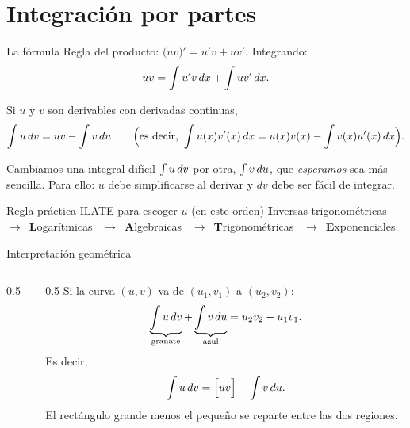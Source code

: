 \documentclass[10pt,aspectratio=169]{beamer}
\begin{document}
\section{Integración por partes}

\begin{frame}{La fórmula}
  Regla del producto: $\big(u v\big)'=u'v+uv'$. Integrando:
  \[ uv=\int u'v\,dx+\int uv'\,dx. \]
  \begin{teorema}
    Si $u$ y $v$ son derivables con derivadas continuas,
    \[ \int u\,dv=uv-\int v\,du \qquad\Big(\text{es decir, } \int u(x)v'(x)\,dx=u(x)v(x)-\int v(x)u'(x)\,dx\Big). \]
  \end{teorema}
  \begin{idea}
    Cambiamos una integral difícil $\int u\,dv$ por otra, $\int v\,du$, que \emph{esperamos} sea más sencilla.
    Para ello: \textbf{$u$} debe simplificarse al derivar y \textbf{$dv$} debe ser fácil de integrar.
  \end{idea}
  \begin{block}{Regla práctica ILATE para escoger $u$ (en este orden)}
    \textbf{I}nversas trigonométricas \ $\to$\ \textbf{L}ogarítmicas \ $\to$\ \textbf{A}lgebraicas
    \ $\to$\ \textbf{T}rigonométricas \ $\to$\ \textbf{E}xponenciales.
  \end{block}
\end{frame}

\begin{frame}{Interpretación geométrica}
  \begin{columns}
    \begin{column}{0.5\textwidth}
      \centering
    \end{column}
    \begin{column}{0.5\textwidth}
      Si la curva $(u,v)$ va de $(u_1,v_1)$ a $(u_2,v_2)$:
      \[
        \underbrace{\int u\,dv}_{\text{granate}}+\underbrace{\int v\,du}_{\text{azul}}
        = u_2v_2-u_1v_1.
      \]
      Es decir,
      \[ \int u\,dv=\Big[uv\Big]-\int v\,du. \]
      \small El rectángulo grande menos el pequeño se reparte entre las dos regiones.
    \end{column}
  \end{columns}
\end{frame}
\end{document}
